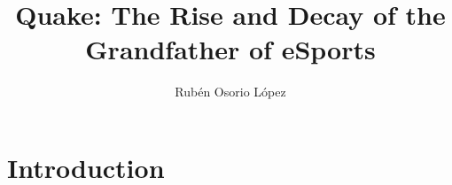 \documentclass[twocolumn]{article}
\title{Quake: The Rise and Decay of the Grandfather of eSports}
\author{Rubén Osorio López}
\begin{document}
\maketitle

\begin{abstract}

\end{abstract}

\section{Introduction}
\end{document}
